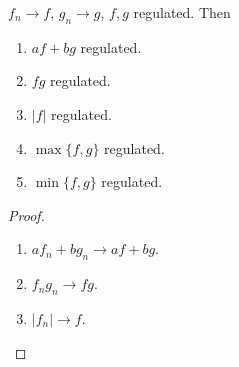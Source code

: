 \begin{proposition}\label{prop:reg_COLT}
    $f_n \to f$,
    $g_n \to g$,
    $f, g$ regulated.
    Then
    \begin{enumerate}[label = (\roman*)]
        \item $af + bg$ regulated.

        \item $fg$ regulated.

        \item $|f|$ regulated.
        
        \item $\max\{f, g\}$ regulated.
        
        \item $\min\{f, g\}$ regulated.
    \end{enumerate}
\end{proposition}
\begin{proof}
    \begin{enumerate}[label = (\roman*)]
        \item $af_n + bg_n \to af + bg$.

        \item $f_ng_n \to fg$.

        \item $|f_n| \to f$.
    \end{enumerate}
\end{proof}






























